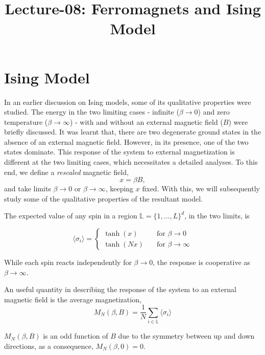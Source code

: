 \documentclass[letterpaper,english,10pt]{article}
\title{Lecture-08: Ferromagnets and Ising Model}
\begin{document}
\maketitle
\section{Ising Model}

In an earlier discussion on Ising models, some of its qualitative properties were studied. The energy in the two limiting cases - infinite ($\beta \to 0$) and zero temperature ($\beta \to \infty$) - with and without an external magnetic field ($B$) were briefly discussed. It was learnt that, there are two degenerate ground states in the absence of an external magnetic field. However, in its presence, one of the two states dominate. This response of the system to external magnetization is different at the two limiting cases, which necessitates a detailed analyses. To this end, we define a \textit{rescaled} magnetic field, $$x=\beta B,$$ and take limits $\beta \to 0$ or $\beta \to \infty$, keeping $x$ fixed. With this, we will subsequently study some of the qualitative properties of the resultant model.

\begin{defn}
	The expected value of any spin in a region $\mathbb{L}=\{1,\ldots,L\}^{d}$, in the two limits, is  
	
	\[\langle\sigma_{i}\rangle =
	\begin{cases}
	\tanh(x) & \quad \text{for } \beta \to 0 \\
	\tanh(Nx) & \quad \text{for } \beta \to \infty
	\end{cases}	\]

While each spin reacts independently for $\beta \to 0$, the response is cooperative as $\beta \to \infty$.
\end{defn}
\begin{defn} An useful quantity in describing the response of the system to an external magnetic field is the average magnetization,
	$$M_{N}(\beta,B)=\frac{1}{N}\sum_{i\in \mathbb{L}}\langle\sigma_{i}\rangle$$
	
	$M_{N}(\beta,B)$ is an odd function of $B$ due to the symmetry between up and down directions, as a consequence, $M_{N}(\beta,0) = 0$. 

\end{defn}
\end{document}
